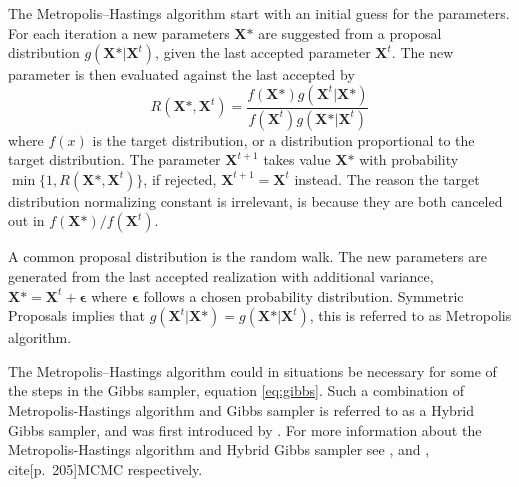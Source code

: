 The Metropolis–Hastings algorithm start with an initial guess for the parameters. For each iteration a new parameters $\boldsymbol{X} \mbox{*}$ are suggested from a proposal distribution $g(\boldsymbol{X} \mbox{*}|\boldsymbol{X}^t)$, given the last accepted parameter $\boldsymbol{X}^t$. The new parameter is then evaluated against the last accepted by
\begin{equation}
\label{eq:MHratio}
R(\boldsymbol{X} \mbox{*},\boldsymbol{X}^{t})=\frac{f(\boldsymbol{X} \mbox{*})g(\boldsymbol{X}^{t}|\boldsymbol{X} \mbox{*})}{f(\boldsymbol{X}^{t})g(\boldsymbol{X} \mbox{*}|\boldsymbol{X}^{t})}
\end{equation}
where $f(x)$ is the target distribution, or a distribution proportional to the target distribution. The parameter $\boldsymbol{X}^{t+1}$ takes value $\boldsymbol{X}\mbox{*}$ with probability $\min\{1,R(\boldsymbol{X} \mbox{*},\boldsymbol{X}^{t})\}$, if rejected, $\boldsymbol{X}^{t+1}=\boldsymbol{X}^t$ instead. The reason the target distribution normalizing constant is irrelevant, is because they are both canceled out in $f(\boldsymbol{X} \mbox{*})/f(\boldsymbol{X}^{t})$.

A common proposal distribution is the random walk. The new parameters are generated from the last accepted realization with additional variance, $\boldsymbol{X}\mbox{*}= \boldsymbol{X}^{t} + \boldsymbol{\epsilon}$ where $\boldsymbol{\epsilon}$ follows a chosen probability distribution. Symmetric Proposals implies that $ g(\boldsymbol{X}^{t}|\boldsymbol{X} \mbox{*}) = g(\boldsymbol{X} \mbox{*}|\boldsymbol{X}^{t})$, this is referred to as Metropolis algorithm.

The Metropolis–Hastings algorithm could in situations be necessary for some of the steps in the Gibbs sampler, equation \eqref{eq:gibbs}. Such a combination of Metropolis-Hastings algorithm and Gibbs sampler is referred to as a Hybrid Gibbs sampler, and was first introduced by \cite{HG}. For more information about the Metropolis-Hastings algorithm and Hybrid Gibbs sampler see \cite[p.~202]{compstat}, \cite[p.~191]{MCMC} and \cite[p.~216]{compstat}, cite[p.~205]{MCMC} respectively.  


